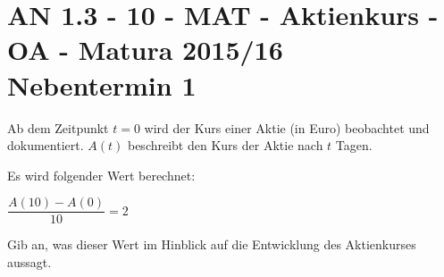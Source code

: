 \section{AN 1.3 - 10 - MAT - Aktienkurs - OA - Matura 2015/16 Nebentermin 1}

\begin{beispiel}[AN 1.3]{1} %
Ab dem Zeitpunkt $t=0$ wird der Kurs einer Aktie (in Euro) beobachtet und dokumentiert. $A(t)$ beschreibt den Kurs der Aktie nach $t$ Tagen. 

Es wird folgender Wert berechnet:

$\dfrac{A(10)-A(0)}{10}=2$

Gib an, was dieser Wert im Hinblick auf die Entwicklung des Aktienkurses aussagt. 

\end{beispiel}